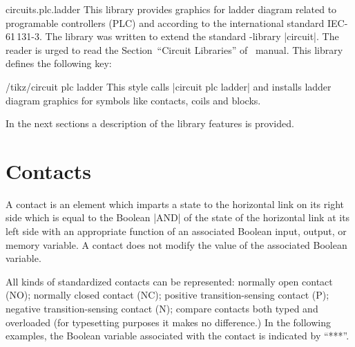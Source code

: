 \documentclass[a4paper]{ltxdoc}
\begin{document}
\begin{pgflibrary}{circuits.plc.ladder}
This library provides graphics for ladder diagram related to programable controllers (PLC) and according to the international standard IEC-61\,131-3. The library was written to extend the standard \tikzname-library |circuit|. The reader is urged to read the Section~``Circuit Libraries'' of \tikzname\ manual.
This library defines the following key:

\begin{key}{/tikz/circuit plc ladder}
This style calls |circuit plc ladder| and installs ladder diagram graphics for symbols like contacts, coils and blocks.
\end{key}
In the next sections a description of the library features is provided.
\end{pgflibrary}


\section{Contacts}
A contact is an element which imparts a state to the horizontal link on its right side which is equal to the Boolean |AND| of the state of the horizontal link at its left side with an appropriate function of an associated Boolean input, output, or memory variable. A contact does not modify the value of the associated Boolean variable.

\begin{codeexample}[]
\end{codeexample}

All kinds of standardized contacts can be represented: normally open contact (NO); normally closed contact (NC); positive transition-sensing contact (P); negative transition-sensing contact (N); compare contacts both typed and overloaded (for typesetting purposes it makes no difference.) In the following examples, the Boolean variable associated with the contact is indicated by ``***''.
\end{document}
